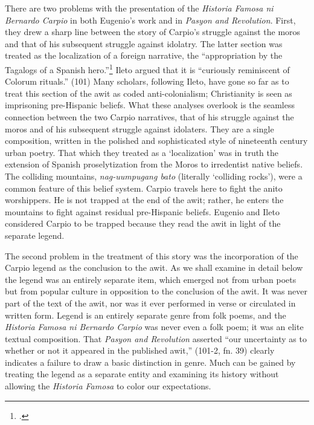There are two problems with the presentation of the \textit{Historia Famosa ni Bernardo Carpio} in both Eugenio's work and in \textit{Pasyon and Revolution}. First, they drew a sharp line between the story of Carpio's struggle against the moros and that of his subsequent struggle against idolatry. The latter section was treated as the localization of a foreign narrative, the \enquote{appropriation by the Tagalogs of a Spanish hero.}\footcite[9]{Ileto1998} Ileto argued that it is \enquote{curiously reminiscent of Colorum rituals.} (101) Many scholars, following Ileto, have gone so far as to treat this section of the awit as coded anti-colonialism; Christianity is seen as imprisoning pre-Hispanic beliefs. What these analyses overlook is the seamless connection between the two Carpio narratives, that of his struggle against the moros and of his subsequent struggle against idolaters. They are a single composition, written in the polished and sophisticated style of nineteenth century urban poetry. That which they treated as a \enquote*{localization} was in truth the extension of Spanish proselytization from the Moros to irredentist native beliefs. The colliding mountains, \textit{nag-uumpugang bato} (literally \enquote*{colliding rocks}), were a common feature of this belief system. Carpio travels here to fight the anito worshippers. He is not trapped at the end of the awit; rather, he enters the mountains to fight against residual pre-Hispanic beliefs. Eugenio and Ileto considered Carpio to be trapped because they read the awit in light of the separate legend.

The second problem in the treatment of this story was the incorporation of the Carpio legend as the conclusion to the awit. As we shall examine in detail below the legend was an entirely separate item, which emerged not from urban poets but from popular culture in opposition to the conclusion of the awit. It was never part of the text of the awit, nor was it ever performed in verse or circulated in written form. Legend is an entirely separate genre from folk poems, and the \textit{Historia Famosa ni Bernardo Carpio} was never even a folk poem; it was an elite textual composition. That \textit{Pasyon and Revolution} asserted \enquote{our uncertainty as to whether or not it appeared in the published awit,} (101-2, fn. 39) clearly indicates a failure to draw a basic distinction in genre. Much can be gained by treating the legend as a separate entity and examining its history without allowing the \textit{Historia Famosa} to color our expectations.

